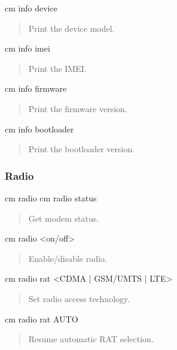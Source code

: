 \begin{DoxyVerb}cm info device \end{DoxyVerb}
 \begin{quote}
Print the device model. \end{quote}


\begin{DoxyVerb}cm info imei \end{DoxyVerb}
 \begin{quote}
Print the I\+M\+E\+I. \end{quote}


\begin{DoxyVerb}cm info firmware \end{DoxyVerb}
 \begin{quote}
Print the firmware version. \end{quote}


\begin{DoxyVerb}cm info bootloader \end{DoxyVerb}
 \begin{quote}
Print the bootloader version. \end{quote}
\hypertarget{tools_target_cm_toolsTarget_cm_radio}{}\subsubsection{Radio}\label{tools_target_cm_toolsTarget_cm_radio}
\begin{DoxyVerb}cm radio
cm radio status \end{DoxyVerb}
 \begin{quote}
Get modem status. \end{quote}


\begin{DoxyVerb}cm radio <on/off> \end{DoxyVerb}
 \begin{quote}
Enable/disable radio. \end{quote}


\begin{DoxyVerb}cm radio rat <CDMA | GSM/UMTS | LTE> \end{DoxyVerb}
 \begin{quote}
Set radio access technology. \end{quote}


\begin{DoxyVerb}cm radio rat AUTO \end{DoxyVerb}
 \begin{quote}
Resume automatic R\+A\+T selection. \end{quote}


